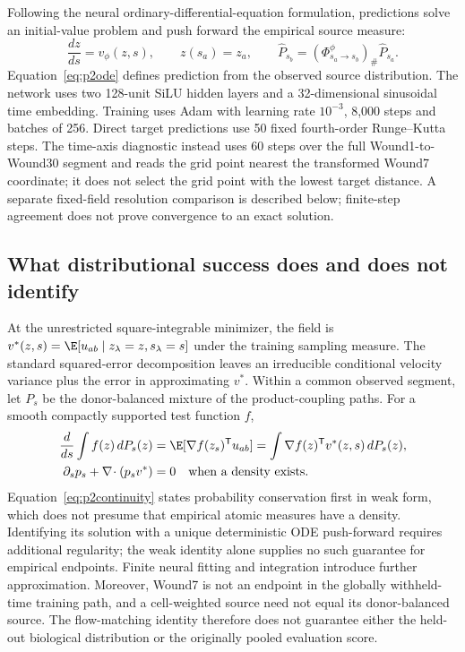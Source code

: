 Following the neural ordinary-differential-equation formulation, predictions solve an initial-value problem and push forward the empirical source measure:
\begin{equation}
\frac{dz}{ds}=v_\phi(z,s),\qquad z(s_a)=z_a,\qquad
\widehat P_{s_b}=(\Phi^\phi_{s_a\rightarrow s_b})_\#\widehat P_{s_a}.\label{eq:p2ode}
\end{equation}
Equation~\eqref{eq:p2ode} defines prediction from the observed source distribution. The network uses two 128-unit SiLU hidden layers and a 32-dimensional sinusoidal time embedding. Training uses Adam with learning rate $10^{-3}$, 8,000 steps and batches of 256. Direct target predictions use 50 fixed fourth-order Runge--Kutta steps. The time-axis diagnostic instead uses 60 steps over the full Wound1-to-Wound30 segment and reads the grid point nearest the transformed Wound7 coordinate; it does not select the grid point with the lowest target distance. A separate fixed-field resolution comparison is described below; finite-step agreement does not prove convergence to an exact solution.

\subsection{What distributional success does and does not identify}
At the unrestricted square-integrable minimizer, the field is $v^*(z,s)=\E[u_{ab}\mid z_\lambda=z,s_\lambda=s]$ under the training sampling measure. The standard squared-error decomposition leaves an irreducible conditional velocity variance plus the error in approximating $v^*$. Within a common observed segment, let $P_s$ be the donor-balanced mixture of the product-coupling paths. For a smooth compactly supported test function $f$,
\begin{align}
\frac{d}{ds}\int f(z)\,dP_s(z)&=\E[\nabla f(z_s)^{\mathsf T}u_{ab}]
=\int\nabla f(z)^{\mathsf T}v^*(z,s)\,dP_s(z),\notag\\
\partial_s p_s+\nabla\!\cdot(p_sv^*)&=0\quad\text{when a density exists}.\label{eq:p2continuity}
\end{align}
Equation~\eqref{eq:p2continuity} states probability conservation first in weak form, which does not presume that empirical atomic measures have a density. Identifying its solution with a unique deterministic ODE push-forward requires additional regularity; the weak identity alone supplies no such guarantee for empirical endpoints. Finite neural fitting and integration introduce further approximation. Moreover, Wound7 is not an endpoint in the globally withheld-time training path, and a cell-weighted source need not equal its donor-balanced source. The flow-matching identity therefore does not guarantee either the held-out biological distribution or the originally pooled evaluation score.

